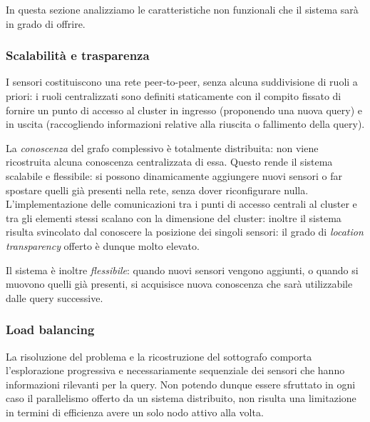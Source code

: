 \documentclass{llncs}
\begin{document}
In questa sezione analizziamo le caratteristiche non funzionali
che il sistema sarà in grado di offrire.

\subsubsection*{Scalabilità e trasparenza}
I sensori costituiscono una rete peer-to-peer,
senza alcuna suddivisione di ruoli a priori: i ruoli centralizzati
sono definiti staticamente con il compito fissato di fornire un punto
di accesso al cluster in ingresso (proponendo una nuova query) e
in uscita (raccogliendo informazioni relative alla riuscita
o fallimento della query).

La \emph{conoscenza} del grafo complessivo è totalmente distribuita:
non viene ricostruita alcuna conoscenza centralizzata di essa.
Questo rende il sistema scalabile e flessibile:
si possono dinamicamente aggiungere nuovi sensori o far spostare
quelli già presenti nella rete, senza dover riconfigurare nulla.
L'implementazione delle
comunicazioni tra i punti di accesso centrali al cluster e
tra gli elementi stessi scalano con la dimensione del cluster:
inoltre il sistema risulta svincolato dal conoscere la posizione
dei singoli sensori: il grado di \emph{location transparency} offerto
è dunque molto elevato.

Il sistema è inoltre \emph{flessibile}: quando nuovi sensori vengono
aggiunti, o quando si muovono quelli già presenti, si acquisisce
nuova conoscenza che sarà utilizzabile dalle query successive.

\subsubsection*{Load balancing}
La risoluzione del problema e la ricostruzione del sottografo
comporta l'esplorazione progressiva e necessariamente sequenziale
dei sensori che hanno informazioni rilevanti per la query.
Non potendo dunque essere sfruttato in ogni caso il parallelismo
offerto da un sistema distribuito, non risulta una limitazione
in termini di efficienza avere un solo nodo attivo alla volta.
\end{document}
